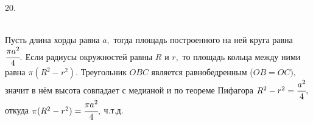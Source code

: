 20. \begin{figure}[ht!]
\end{figure}\\
Пусть длина хорды равна $a,$ тогда площадь построенного на ней круга равна $\cfrac{\pi a^2}{4}.$ Если радиусы окружностей равны $R$ и $r,$ то площадь кольца между ними равна $\pi(R^2-r^2).$ Треугольник $OBC$ является равнобедренным ($OB=OC),$ значит в нём высота совпадает с медианой и по теореме Пифагора $R^2-r^2=\cfrac{a^2}{4},$ откуда $\pi(R^2-r^2)=\cfrac{\pi a^2}{4},$ ч.т.д.\\
